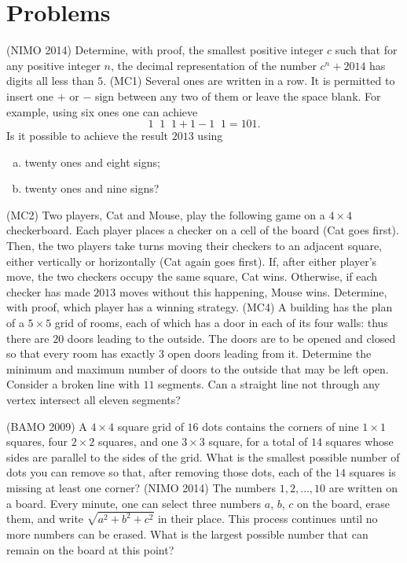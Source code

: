\documentclass[11pt]{scrartcl}
\begin{document}
\section{Problems}
\begin{enumerate}
  \ii (NIMO 2014) Determine, with proof, the smallest positive integer $c$ such that for any positive integer $n$, the decimal representation of the number $c^n+2014$ has digits all less than $5$.
  \ii (MC1) Several ones are written in a row. It is permitted to insert one $+$ or $-$ sign between any two of them or leave the space blank. For example, using six ones one can achieve \[ \newcommand{\php}{\mathop{\phantom{+}}} 1 \php 1 \php 1 + 1 - 1 \php 1 = 101.  \]
  Is it possible to achieve the result $2013$ using
  \begin{enumerate}[(a)]
    \item twenty ones and eight signs; %
    \item twenty ones and nine signs?  %
  \end{enumerate}
  \ii (MC2) Two players, Cat and Mouse, play the following game on a $4\times 4$ checkerboard. Each player places a checker on a cell of the board (Cat goes first). Then, the two players take turns moving their checkers to an adjacent square, either vertically or horizontally (Cat again goes first). If, after either player's move, the two checkers occupy the same square, Cat wins. Otherwise, if each checker has made $2013$ moves without this happening, Mouse wins. Determine, with proof, which player has a winning strategy. %
  \ii (MC4) A building has the plan of a $5 \times 5$ grid of rooms, each of which has a door in each of its four walls: thus there are $20$ doors leading to the outside. The doors are to be opened and closed so that every room has exactly $3$ open doors leading from it. Determine the minimum and maximum number of doors to the outside that may be left open. %
  \ii Consider a broken line with $11$ segments. Can a straight line not through any vertex intersect all eleven segments? %


  \ii (BAMO 2009) A $4 \times 4$ square grid of $16$ dots contains the corners of nine $1 \times 1$ squares, four $2 \times 2$ squares, and one $3 \times 3$ square, for a total of $14$ squares whose sides are parallel to the sides of the grid. What is the smallest possible number of dots you can remove so that, after removing those dots, each of the $14$ squares is missing at least one corner?
  \ii (NIMO 2014) The numbers $1,2,\dots,10$ are written on a board. Every minute, one can select three numbers $a$, $b$, $c$ on the board, erase them, and write $\sqrt{a^2+b^2+c^2}$ in their place. This process continues until no more numbers can be erased. What is the largest possible number that can remain on the board at this point?


\end{enumerate}
\end{document}
